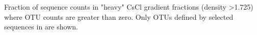 Fraction of sequence counts in "heavy" CsCl gradient fractions (density \textgreater 1.725) where OTU counts are greater than zero. Only OTUs defined by selected sequences in \citet{Yeager} are shown.